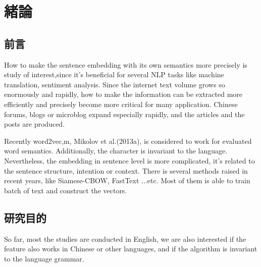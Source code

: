 \chapter{緒論}
\setlength{\baselineskip}{1.5em}
\setlength{\parindent}{2em}
\setlength{\parskip}{1em}

\section{前言}

How to make the sentence embedding with its own semantics more precisely is study of interest,since it's beneficial for several NLP tasks like machine translation, sentiment analysis. Since the internet text volume grows so enormously and rapidly, how to make the information can be extracted more efficiently and precisely become more critical for many application. Chinese forums, blogs or microblog expand especially rapidly, and the articles and the posts are produced.

Recently word2vec,m, Mikolov et al.(2013a), is considered to work for evaluated word semantics.  Additionally, the character is invariant to the language. Nevertheless, the embedding in sentence level is more complicated, it's related to the sentence structure,  intention or context. There is several methods raised in recent years, like Siamese-CBOW, FastText ...etc. Most of them is able to train batch of text and construct the vectors.

\section{研究目的}

So far, most the studies are conducted in English, we are also interested if the feature also works in Chinese or other languages, and if the algorithm is invariant to the language grammar.
